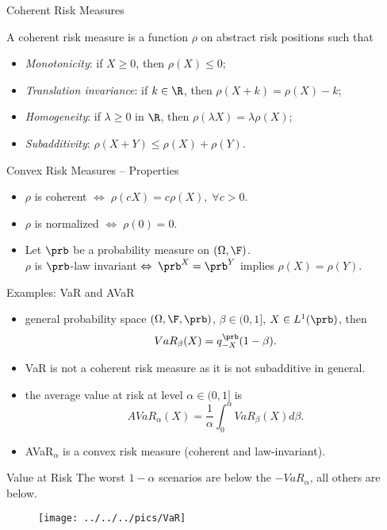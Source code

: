 {Coherent Risk Measures}

A coherent risk measure is a function $\rho$ on abstract risk positions such that
\begin{itemize}
\item<1-> \emph{Monotonicity}: if $X\geq 0$, then $\rho(X)\leq 0$;
\item<2-> \emph{Translation invariance}: if $k \in \R$, then
$\rho(X+k)=\rho(X)-k$;
\item<3-> \emph{Homogeneity}: if $\lambda \geq 0$ in $\R$, then $\rho(\lambda X)
= \lambda \rho (X)$;
\item<4-> \emph{Subadditivity}: $\rho(X+Y)\leq \rho(X)+\rho(Y)$.
\end{itemize}






{Convex Risk Measures -- Properties}

\begin{itemize}
\item $\rho$ is coherent $\Leftrightarrow \; \rho(cX) = c \rho(X), \; \forall c>0$.
\item $\rho$ is normalized $\Leftrightarrow \; \rho(0) = 0$.
\item Let $\prb$ be a probability measure on $(\Omega, \F)$.\\
$\rho$ is $\prb$-law invariant $\Leftrightarrow \; \prb^X = \prb^Y $ implies $\rho(X) = \rho(Y)$.
\end{itemize}



{Examples: VaR and AVaR}
\begin{itemize}
\item general probability space $(\Omega, \F, \prb)$, $\beta \in (0,1]$, $X\in L^1(\prb)$, then
$$
VaR_\beta(X) = q_{-X}^{\prb}(1-\beta).
$$
 \item VaR is not a coherent risk measure as it is not subadditive in general.
\item the average value at risk at level $\alpha \in (0,1]$ is
$$
AVaR_\alpha(X) = \frac{1}{\alpha} \int_0^\alpha VaR_\beta(X) d\beta.
$$
\item AVaR$_\alpha$ is a convex risk measure (coherent and law-invariant).
\end{itemize}




{Value at Risk}
The worst $1-\alpha$ scenarios are below the $-VaR_\alpha$, all others are below.
\begin{figure}
	\centering
		\texttt{[image: ../../../pics/VaR]}
	\label{fig:VaR}
\end{figure}


